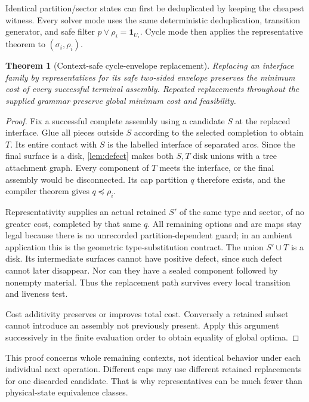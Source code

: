 \documentclass[11pt,a4paper]{article}
\newtheorem{theorem}{Theorem}[section]
\theoremstyle{definition}
\theoremstyle{remark}
\newcommand{\one}{\mathbf 1}
\begin{document}
Identical partition/sector states can first be deduplicated by keeping the cheapest
witness. Every solver mode uses the same deterministic deduplication, transition generator,
and safe filter $p\vee\rho_i=\one_{U_i}$. Cycle mode then applies the representative
theorem to $(\sigma_i,\rho_i)$.

\begin{theorem}[Context-safe cycle-envelope replacement]\label{thm:composition}
Replacing an interface family by representatives for its safe two-sided envelope preserves
the minimum cost of every successful terminal assembly. Repeated replacements throughout
the supplied grammar preserve global minimum cost and feasibility.
\end{theorem}
\begin{proof}
Fix a successful complete assembly using a candidate $S$ at the replaced interface.
Glue all pieces outside $S$ according to the selected completion to obtain $T$.
Its entire contact with $S$ is the labelled interface of separated arcs. Since the final
surface is a disk, \cref{lem:defect} makes both $S,T$ disk unions with a tree attachment
graph. Every component of $T$ meets the interface, or the final assembly would be
disconnected. Its cap partition $q$ therefore exists, and the compiler theorem gives
$q\preceq\rho_i$.

Representativity supplies an actual retained $S'$ of the same type and sector, of no
greater cost, completed by that same $q$. All remaining options and arc maps stay legal
because there is no unrecorded partition-dependent guard; in an ambient application this
is the geometric type-substitution contract. The union $S'\cup T$ is a disk.
Its intermediate surfaces cannot have positive defect, since such defect cannot later
disappear. Nor can they have a sealed component followed by nonempty material.
Thus the replacement path survives every local transition and liveness test.

Cost additivity preserves or improves total cost. Conversely a retained subset cannot
introduce an assembly not previously present. Apply this argument successively in the
finite evaluation order to obtain equality of global optima.
\end{proof}

This proof concerns whole remaining contexts, not identical behavior under each individual
next operation. Different caps may use different retained replacements for one discarded
candidate. That is why representatives can be much fewer than physical-state equivalence
classes.
\end{document}
